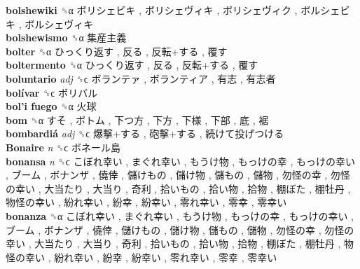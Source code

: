 \textbf{bolshewiki} ␝α   ボリシェビキ ,  ボリシェヴィキ ,  ボリシェヴィク ,  ボルシェビキ ,  ボルシェヴィキ   \\
\textbf{bolshewismo} ␝α   集産主義   \\
\textbf{bolter} ␝α   ひっくり返す ,  反る ,  反転+する ,  覆す   \\
\textbf{boltermento} ␝α   ひっくり返す ,  反る ,  反転+する ,  覆す   \\
\textbf{boluntario} \emph{adj}  ␝ϲ   ボランテァ ,  ボランティア ,  有志 ,  有志者   \\
\textbf{bolívar} ␝ϲ   ボリバル   \\
\textbf{bol’i fuego} ␝α   火球   \\
\textbf{bom} ␝α   すそ ,  ボトム ,  下つ方 ,  下方 ,  下様 ,  下部 ,  底 ,  裾   \\
\textbf{bombardiá} \emph{adj}  ␝ϲ   爆撃+する ,  砲撃+する ,  続けて投げつける   \\
\textbf{Bonaire} \emph{n}  ␝ϲ   ボネール島   \\
\textbf{bonansa} \emph{n}  ␝ϲ   こぼれ幸い ,  まぐれ幸い ,  もうけ物 ,  もっけの幸 ,  もっけの幸い ,  ブーム ,  ボナンザ ,  僥倖 ,  儲けもの ,  儲け物 ,  儲もの ,  儲物 ,  勿怪の幸 ,  勿怪の幸い ,  大当たり ,  大当り ,  奇利 ,  拾いもの ,  拾い物 ,  拾物 ,  棚ぼた ,  棚牡丹 ,  物怪の幸い ,  紛れ幸い ,  紛幸 ,  紛幸い ,  零れ幸い ,  零幸 ,  零幸い   \\
\textbf{bonanza} ␝α   こぼれ幸い ,  まぐれ幸い ,  もうけ物 ,  もっけの幸 ,  もっけの幸い ,  ブーム ,  ボナンザ ,  僥倖 ,  儲けもの ,  儲け物 ,  儲もの ,  儲物 ,  勿怪の幸 ,  勿怪の幸い ,  大当たり ,  大当り ,  奇利 ,  拾いもの ,  拾い物 ,  拾物 ,  棚ぼた ,  棚牡丹 ,  物怪の幸い ,  紛れ幸い ,  紛幸 ,  紛幸い ,  零れ幸い ,  零幸 ,  零幸い   \\
